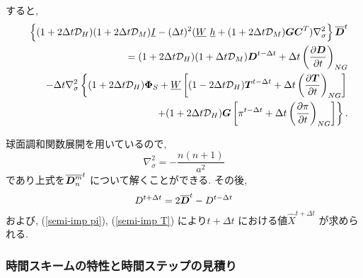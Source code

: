 すると, 
%
\begin{eqnarray}
  \label{semi-imp barD}
&   &   \left\{ ( 1+2\Delta t {\cal D}_H )( 1+2\Delta t {\cal D}_M )
           \underline{I}  
      - ( \Delta t )^{2}  ( \underline{W} \ \underline{h} 
           + (1+2\Delta t {\cal D}_M)
             \Dvect{G} \Dvect{C}^{T} ) \nabla^{2}_{\sigma}
  \right\}
      \overline{ \Dvect{D} }^{t} 
      \nonumber \\
& & = ( 1+2\Delta t {\cal D}_H )( 1+\Delta t {\cal D}_M ) 
       \Dvect{D}^{t-\Delta t}
  + \Delta t 
     \left( \frac{\partial \Dvect{D}}{\partial t} \right)_{NG}  
 \nonumber \\
& & -  \Delta t \nabla^{2}_{\sigma}     
                   \left\{  ( 1+2\Delta t {\cal D}_H ) \Dvect{\Phi}_{S} 
                          + \underline{W} 
                            \left[ ( 1-2\Delta t {\cal D}_H ) 
                                    \Dvect{T}^{t-\Delta t}
                                  + \Delta t 
                                      \left( \frac{\partial \Dvect{T}}
                                                  {\partial t}     
                                      \right)_{NG} \right]
                   \right.
 \nonumber \\
  &  &             \left.  \hspace*{20mm} 
                          + ( 1+2\Delta t {\cal D}_H ) \Dvect{G} 
                            \left[ \pi^{t-\Delta t} 
                                  + \Delta t
                                     \left( \frac{\partial \pi}
                                                 {\partial t} 
                                     \right)_{NG}  \right]
                   \right\} . 
\end{eqnarray}

球面調和関数展開を用いているので,
\[
    \nabla^{2}_{\sigma} = - \frac{n(n+1)}{a^{2}}
\]
であり上式を$\overline{ \Dvect{D}_n^m }^{t}$ について解くことができる.
%
その後,
%
\begin{equation}
   D^{t+\Delta t} = 2\overline{ \Dvect{D} }^{t} - D^{t-\Delta t}
\end{equation}
%
および, (\ref{semi-imp pi}), (\ref{semi-imp T})
により$t+\Delta t$ における値$\hat{X}^{t+\Delta t}$
が求められる.

\subsubsection{時間スキームの特性と時間ステップの見積り}

